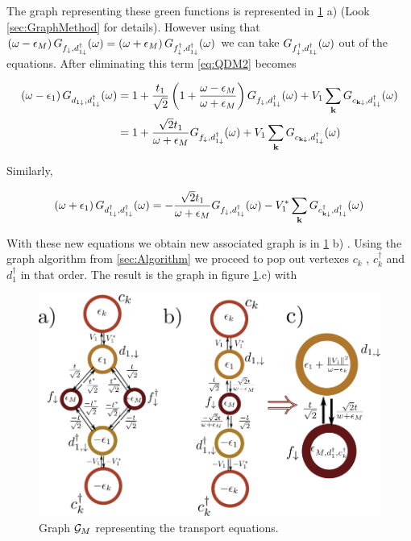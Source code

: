 The graph representing these green functions is represented in \ref{fig:green-M-QD} a)  (Look \ref{sec:GraphMethod} for details). However using that $\left(\omega-\epsilon_{M}\right)G_{f_{\downarrow},d_{1\downarrow}^{\dagger}}(\omega)=\left(\omega+\epsilon_{M}\right)G_{f_{\downarrow}^{\dagger},d_{1\downarrow}^{\dagger}}(\omega)$ we can take
 $G_{f_{\downarrow}^{\dagger},d_{1\downarrow}^{\dagger}}(\omega)$ out of the equations. After eliminating this term \ref{eq:QDM2} becomes
 
 \begin{align}
\left(\omega-\epsilon_{1}\right)G_{d_{1\downarrow},d_{1\downarrow}^{\dagger}}(\omega)&=1+\frac{t_{1}}{\sqrt{2}}\left(1+\frac{\omega-\epsilon_{M}}{\omega+\epsilon_{M}}\right)G_{f_{\downarrow},d_{1\downarrow}^{\dagger}}(\omega)+V_{1}\sum_{\mathbf{k}}G_{c_{\mathbf{k\downarrow}},d_{1\downarrow}^{\dagger}}(\omega) \\
&=1+\frac{\sqrt{2}t_{1}}{\omega+\epsilon_{M}}G_{f_{\downarrow},d_{1\downarrow}^{\dagger}}(\omega)+V_{1}\sum_{\mathbf{k}}G_{c_{\mathbf{k\downarrow}},d_{1\downarrow}^{\dagger}}(\omega)
\end{align}

Similarly, 

\begin{equation}
    \left(\omega+\epsilon_{1}\right)G_{d_{1\downarrow}^{\dagger},d_{1\downarrow}^{\dagger}}(\omega)=-\frac{\sqrt{2}t_{1}}{\omega+\epsilon_{M}}G_{f_{\downarrow},d_{1\downarrow}^{\dagger}}(\omega)-V_{1}^{*}\sum_{\mathbf{k}}G_{c_{\mathbf{k\downarrow}}^{\dagger},d_{1\downarrow}^{\dagger}}(\omega)
\end{equation} 
 
 
 With these new equations we obtain new associated graph is  in \ref{fig:green-M-QD} b) .  Using the graph algorithm from \ref{sec:Algorithm}  we proceed to pop out vertexes $c_k$ , $c_k^\dagger$ and $d_1^\dagger$ in that order. The result is the graph in figure \ref{fig:green-M-QD}.c) with 
 
 \begin{figure}[t]
    \centering
    \includegraphics[scale=0.5]{IMAGES/Graphs/Grenn-Majorana.png}
    \caption{ Graph $\mathcal{G}_M$ representing the transport equations.  \label{fig:green-M-QD} \protect{}}
\end{figure}
 
